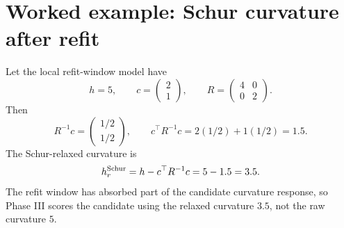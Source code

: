 \documentclass[10pt,twocolumn]{article}
\begin{document}
\section{Worked example: Schur curvature after refit}

Let the local refit-window model have
\begin{equation}
h=5,\qquad
c=\begin{pmatrix}2\\1\end{pmatrix},
\qquad
R=
\begin{pmatrix}4&0\\0&2\end{pmatrix}.
\end{equation}
Then
\begin{equation}
R^{-1}c=
\begin{pmatrix}1/2\\1/2\end{pmatrix},
\qquad
c^\top R^{-1}c=2(1/2)+1(1/2)=1.5.
\end{equation}
The Schur-relaxed curvature is
\begin{equation}
h_r^{\rm Schur}=h-c^\top R^{-1}c=5-1.5=3.5.
\end{equation}
The refit window has absorbed part of the candidate curvature response, so Phase III scores the candidate using the relaxed curvature \(3.5\), not the raw curvature \(5\).
\end{document}
